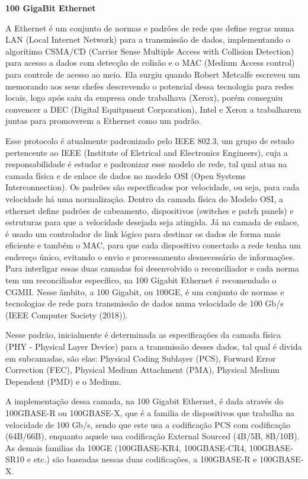 \documentclass[a4paper,12pt]{article}
\begin{document}
\begin{center}
\textbf{{\LARGE 100 GigaBit Ethernet}} \\ \vspace{0.5cm}
\end{center}

A Ethernet é um conjunto de normas e padrões de rede que define regras numa LAN (Local Internet Network) para a transmissão de dados, implementando o algorítimo CSMA/CD (Carrier Sense Multiple Access with Collision Detection) para acesso a dados com detecção de colisão e o MAC (Medium Access control) para controle de acesso ao meio. Ela surgiu quando Robert Metcalfe escreveu um memorando aos seus chefes descrevendo o potencial dessa tecnologia para redes locais, logo após saiu da empresa onde trabalhava (Xerox), porém conseguiu convencer a DEC (Digital Equitpment Corporation), Intel e Xerox a trabalharem juntas para promoverem a Ethernet como um padrão.

Esse protocolo é atualmente padronizado pelo IEEE 802.3, um grupo de estudo pertencente ao IEEE (Institute of Eletrical and Electronics Engineers), cuja a responsabilidade é estudar e padronizar esse modelo de rede, tal qual atua na camada física e de enlace de dados no modelo OSI (Open Systems Interconnection). Os padrões são especificados por velocidade, ou seja, para cada velocidade há uma normalização.
Dentro da camada física do Modelo OSI, a ethernet define padrões de cabeamento, dispositivos (switches e patch panels) e estruturas para que a velocidade desejada seja atingida.
Já na camada de enlace, é usado um controlador de link lógico para destinar os dados de forma mais eficiente e também o MAC, para que cada dispositivo conectado a rede tenha um endereço único, evitando o envio e processamento desnecessário de informações.
Para interligar essas duas camadas foi desenvolvido o reconciliador e cada norma tem um reconciliador específico, na 100 Gigabit Ethernet é recomendado o CGMII.
Nesse âmbito, a 100 Gigabit, ou 100GE, é um conjunto de normas e tecnologias de rede para transmissão de dados numa velocidade de 100 Gb/s (IEEE Computer Society (2018)).


Nesse padrão, inicialmente é determinada as especificações da camada física (PHY - Physical Layer Device) para a transmissão desses dados, tal qual é divida em subcamadas, são elas: Physical Coding Sublayer (PCS), Forward Error Correction (FEC), Physical Medium Attachment (PMA), Physical Medium Dependent (PMD) e o Medium.

A implementação dessa camada, na 100 Gigabit Ethernet, é dada através do 100GBASE-R ou 100GBASE-X, que é a familia de dispositivos que trabalha na velocidade de 100 Gb/s, sendo que este usa a codificação PCS com codificação (64B/66B), enquanto aquele usa codificação External Sourced (4B/5B, 8B/10B). As demais familias da 100GE (100GBASE-KR4, 100GBASE-CR4, 100GBASE-SR10 e etc.) são baseadas nessas duas codificações, a 100GBASE-R e 100GBASE-X.
\end{document}
